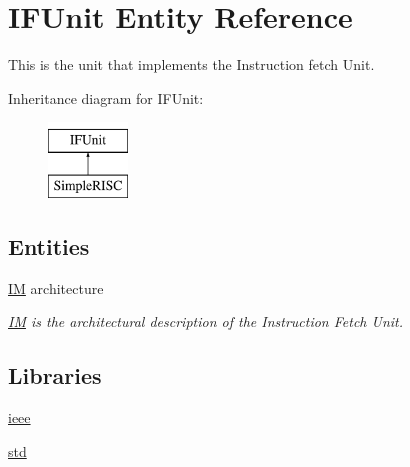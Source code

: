 \hypertarget{class_i_f_unit}{\section{I\-F\-Unit Entity Reference}
\label{class_i_f_unit}
}


This is the unit that implements the Instruction fetch Unit.  


Inheritance diagram for I\-F\-Unit\-:\begin{figure}[H]
\begin{center}
\leavevmode
\includegraphics[height=2.000000cm]{class_i_f_unit}
\end{center}
\end{figure}
\subsection*{Entities}
\begin{DoxyCompactItemize}
\item 
\hyperlink{class_i_f_unit_1_1_i_m}{I\-M} architecture
\begin{DoxyCompactList}\small\item\em \hyperlink{class_i_f_unit_1_1_i_m}{I\-M} is the architectural description of the Instruction Fetch Unit. \end{DoxyCompactList}\end{DoxyCompactItemize}
\subsection*{Libraries}
 \begin{DoxyCompactItemize}
\item 
\hypertarget{class_i_f_unit_a0a6af6eef40212dbaf130d57ce711256}{\hyperlink{class_i_f_unit_a0a6af6eef40212dbaf130d57ce711256}{ieee} }\label{class_i_f_unit_a0a6af6eef40212dbaf130d57ce711256}

\item 
\hypertarget{class_i_f_unit_a17a7c5b2be3cba8592e83e385620216b}{\hyperlink{class_i_f_unit_a17a7c5b2be3cba8592e83e385620216b}{std} }\label{class_i_f_unit_a17a7c5b2be3cba8592e83e385620216b}

\end{DoxyCompactItemize}
